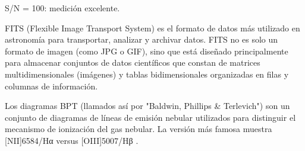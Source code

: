 \documentclass[9pt,twocolumn,a4paper]{opticajnl}
\begin{document}
\begin{description}[style=nextline]
  S/N = 100: medición excelente. \\
  \item[Archivos .fits] FITS (Flexible Image Transport System) es el formato de datos más utilizado en astronomía para transportar, analizar y archivar datos. FITS no es solo un formato de imagen (como JPG o GIF), sino que está diseñado principalmente para almacenar conjuntos de datos científicos que constan de matrices multidimensionales (imágenes) y tablas bidimensionales organizadas en filas y columnas de información.
  \item[Diagramas BPT] Los diagramas BPT (llamados así por "Baldwin, Phillips & Terlevich") son un conjunto de diagramas de líneas de emisión nebular utilizados para distinguir el mecanismo de ionización del gas nebular. La versión más famosa muestra [NII]6584/Hα versus [OIII]5007/Hβ \cite{1981PASP...93....5B}.
\end{description}

\printbibliography
\end{document}
